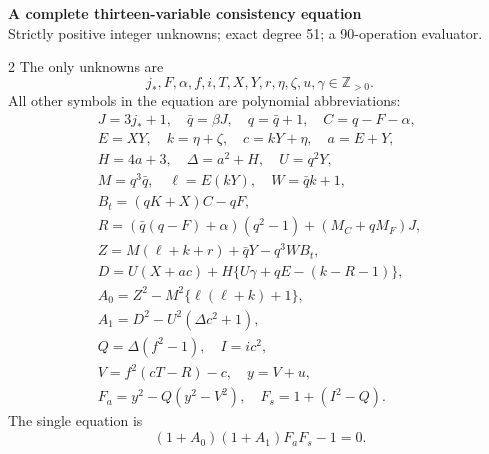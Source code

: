\documentclass[10pt]{article}
\begin{document}
\begin{center}
{\large\bfseries A complete thirteen-variable consistency equation}\\[-1pt]
{\small Strictly positive integer unknowns; exact degree 51; a 90-operation evaluator.}
\end{center}\vspace{-8pt}
\begin{multicols}{2}
\fontsize{9}{10}\selectfont
The only unknowns are
\[
j_*,F,\alpha,f,i,T,X,Y,r,\eta,\zeta,u,\gamma\in\mathbb Z_{>0}.
\]
All other symbols in the equation are polynomial abbreviations:
\[
\begin{gathered}
J=3j_*+1,\quad \bar q=\beta J,\quad q=\bar q+1,\quad C=q-F-\alpha,\\
E=XY,\quad k=\eta+\zeta,\quad c=kY+\eta,\quad a=E+Y,\\
H=4a+3,\quad\Delta=a^2+H,\quad U=q^2Y,\\
M=q^3\bar q,\quad\ell=E(kY),\quad W=\bar qk+1,\\
B_t=(qK+X)C-qF,\\
R=(\bar q(q-F)+\alpha)(q^2-1)+(M_C+qM_F)J,\\
Z=M(\ell+k+r)+\bar qY-q^3WB_t,\\
D=U(X+ac)+H\{U\gamma+qE-(k-R-1)\},\\
A_0=Z^2-M^2\{\ell(\ell+k)+1\},\\
A_1=D^2-U^2(\Delta c^2+1),\\
Q=\Delta(f^2-1),\quad I=ic^2,\\
V=f^2(cT-R)-c,\quad y=V+u,\\
F_a=y^2-Q(y^2-V^2),\quad F_s=1+(I^2-Q).
\end{gathered}
\]
The single equation is
\[
\boxed{(1+A_0)(1+A_1)F_aF_s-1=0.}
\]


\end{multicols}
\end{document}
